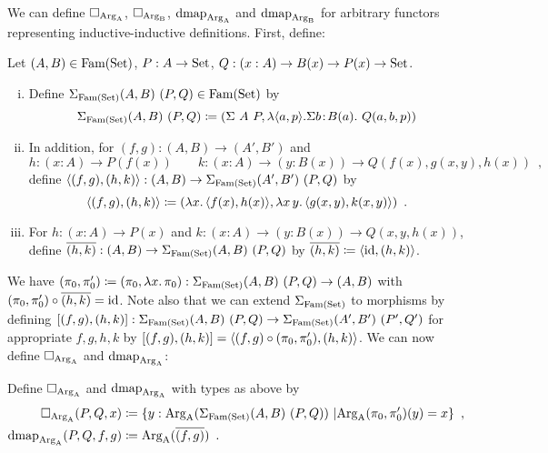 \documentclass[orivec,envcountsame, ,envcountsect]{llncs}
\begin{document}
We can define $\Box_{\text{Arg}_{\text{A}}}$, $\Box_{\text{Arg}_{\text{B}}}$, $\text{dmap}_{\text{Arg}_{\text{A}}}$ and $\text{dmap}_{\text{Arg}_{\text{B}}}$ for arbitrary functors
representing inductive-inductive definitions. First, define:

\begin{definition}
    Let $(A, B) \in \text{Fam}(\text{Set})$, $P : A \to \text{Set}$, $Q : (x : A) \to B(x)
    \to P(x) \to \text{Set}$.
  \begin{enumerate}[(i)]
  \item Define $\Sigma_{\text{Fam}(\text{Set})} (A, B)\ (P, Q) \in \text{Fam}(\text{Set})$ by
 \[
\Sigma_{\text{Fam}(\text{Set})} (A, B)\ (P, Q) \coloneqq (\Sigma\ A\ P, \lambda
    \langle a, p\rangle . \Sigma b\!:\!B(a).\ Q(a, b, p))
 \]
  \item In addition, for $(f, g) : (A, B) \to (A', B')$ and
  \[
h : (x : A) \to P(f(x)) \qquad
k : (x : A) \to (y : B(x)) \to Q(f(x), g(x, y), h(x)) \enspace ,
  \]
define $\langle(f, g), (h, k)\rangle : (A, B) \to \Sigma_{\text{Fam}(\text{Set})} (A', B')\ (P, Q)$ by
\[
\langle(f, g), (h, k)\rangle \coloneqq (\lambda x .\, \langle f(x), h(x)\rangle, \lambda x\,y .\, \langle g(x, y), k(x, y)\rangle) \enspace .
\]
\item For $h : (x : A) \to P(x)$ and $ k : (x : A) \to (y : B(x)) \to
  Q(x, y, h(x))$, define $\overline{(h, k)} : (A, B) \to \Sigma_{\text{Fam}(\text{Set})} (A, B)\
  (P, Q)$ by $\overline{(h, k)} \coloneqq \langle\text{id}, (h, k)\rangle$.
  \end{enumerate}
\end{definition}
We have $(\pi_0, \pi'_0) \coloneqq (\pi_0, \lambda x .\, \pi_0) :
\Sigma_{\text{Fam}(\text{Set})} (A, B)\ (P, Q) \to (A, B)$ with $(\pi_0, \pi'_0) \circ
\overline{(h, k)} = \text{id}$. Note also that we can extend $\Sigma_{\text{Fam}(\text{Set})}$ to
morphisms by defining $[(f, g), (h, k)] : \Sigma_{\text{Fam}(\text{Set})} (A, B)\
(P, Q) \to \Sigma_{\text{Fam}(\text{Set})} (A', B')\ (P', Q')$ for appropriate $f, g, h, k$
by $[(f, g), (h, k)] = \langle(f, g) \circ (\pi_0,
  \pi'_0), (h, k)\rangle$.  We can now define $\Box_{\text{Arg}_{\text{A}}}$ and
$\text{dmap}_{\text{Arg}_{\text{A}}}$:

\begin{definition}
Define $\Box_{\text{Arg}_{\text{A}}}$ and $\text{dmap}_{\text{Arg}_{\text{A}}}$ with types as above by
\begin{align*}
\BOX_{\ArgA}(P, Q, x) &\coloneqq %
    \{ y : \ArgA(\SigmaFAM (A, B)\ (P, Q))\ | \ArgA(\pi_0, \pi'_0)(y) = x\} \enspace , \\
\dmap_{\ArgA}(P, Q, f, g) &\coloneqq %
    \ArgA(\CwFsect{(f, g)}) \enspace .
\end{align*}
\end{definition}
\end{document}

